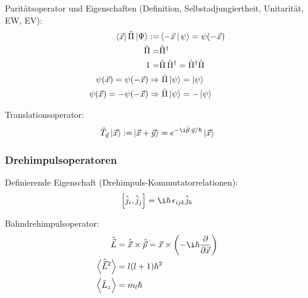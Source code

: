 \documentclass[11pt]{article}
\numberwithin{equation}{section}
\begin{document}
      Paritätsoperator und Eigenschaften (Definition, Selbstadjungiertheit, Unitarität, EW, EV):
      \begin{equation}
        \begin{aligned}
          \Bra{\vec{x}} \hat{\Pi} \Ket{\Psi} :=& \Braket{-\vec{x} | \psi} = \psi(-\vec{x}) \\
          \hat{\Pi} =& \hat{\Pi}^\dagger\\
          1 =& \hat{\Pi} \,\hat{\Pi}^\dagger = \hat{\Pi}^\dagger \hat{\Pi} \\
          \psi(\vec{x}) = \psi(-\vec{x}) \Rightarrow&\; \hat{\Pi}\Ket{\psi} = \Ket{\psi} \\
          \psi(\vec{x}) = -\psi(-\vec{x}) \Rightarrow&\; \hat{\Pi}\Ket{\psi} = -\Ket{\psi} \\
        \end{aligned}
      \end{equation}

      Translationsoperator:
      \begin{equation}
        \begin{aligned}
          \hat{T}_{\vec{y}}\Ket{\vec{x}} :=& \Ket{\vec{x} + \vec{y}} = e^{-\i\hat{\vec{p}}\cdot\vec{y}/\hbar}\Ket{\vec{x}} \\
        \end{aligned}
      \end{equation}

    \subsubsection{Drehimpulsoperatoren}
      Definierende Eigenschaft (Drehimpuls-Kommutatorrelationen):
      \begin{equation}
        \left[ \hat{j}_i, \hat{j}_j \right] = \i\hbar\, \epsilon_{ijk} \hat{j}_k
      \end{equation}

      Bahndrehimpulsoperator:
      \begin{equation}
        \begin{aligned}
          \hat{\vec{L}} &= \hat{\vec{x}}\times \hat{\vec{p}} = \vec{x}\times\left(-\i\hbar\pder{}{\vec{x}}\right) \\
          \left< \hat{\vec{L}}^2 \right> &= l(l+1)\hbar^2 \\
          \left< \hat{L}_z \right> &= m_l \hbar \\
        \end{aligned}
      \end{equation}
\end{document}
